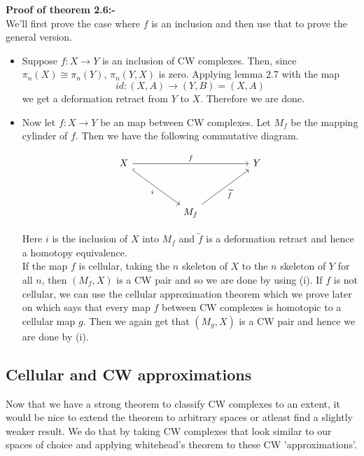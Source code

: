 \documentclass[12pt]{extarticle}
\newcounter{pic}[page]
\numberwithin{equation}{section}
\newenvironment{Proof}[1]
    {\begin{mdframed}\textbf{#1} \\}
    {\end{mdframed}}
\begin{document}
\begin{Proof}{Proof of theorem 2.6:-}
We'll first prove the case where $f$ is an inclusion and then use that to prove the general version.
\begin{itemize}
    \item Suppose $f:X\to Y$ is an inclusion of CW complexes. Then, since $\pi_n(X)\cong \pi_n(Y)$, $\pi_n(Y,X)$ is zero. Applying lemma 2.7 with the map $$id:(X,A)\to (Y,B)=(X,A)$$ we get a deformation retract from $Y$ to $X$. Therefore we are done.\\
    
    \item Now let $f:X\to Y$ be an map between CW complexes. Let $M_f$ be the mapping cylinder of $f$. Then we have the following commutative diagram.
    
    \[\begin{tikzcd}
	X &&&& Y \\
	\\
	&& {M_f}
	\arrow["f", from=1-1, to=1-5]
	\arrow["i"', hook, from=1-1, to=3-3]
	\arrow["{\widetilde{f}}"', from=3-3, to=1-5]
    \end{tikzcd}\]
    
    Here $i$ is the inclusion of $X$ into $M_f$ and $\widetilde{f}$ is a deformation retract and hence a homotopy equivalence.\\
    
    If the map $f$ is cellular, taking the $n$ skeleton of $X$ to the $n$ skeleton of $Y$ for all $n$, then $(M_f,X)$ is a CW pair and so we are done by using (i). If $f$ is not cellular, we can use the cellular approximation theorem which we prove later on which says that every map $f$ between CW complexes is homotopic to a cellular map $g$. Then we again get that $(M_g,X)$ is a CW pair and hence we are done by (i).
    
\end{itemize}

\end{Proof}

\subsection{Cellular and CW approximations}
Now that we have a strong theorem to classify CW complexes to an extent, it would be nice to extend the theorem to arbitrary spaces or atleast find a slightly weaker result. We do that by taking CW complexes that look similar to our spaces of choice and applying whitehead's theorem to these CW 'approximations'.\\
\end{document}

